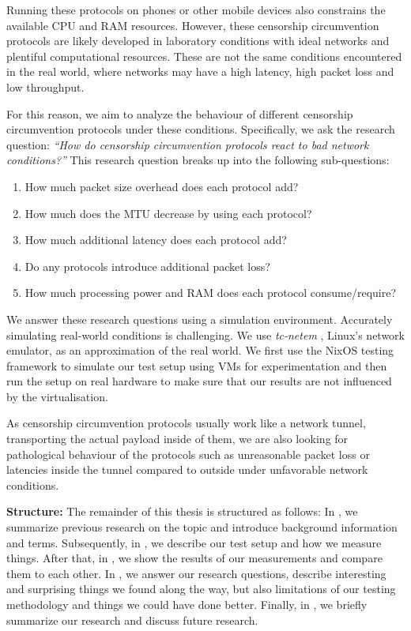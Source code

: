 Running these protocols on phones or other mobile devices also constrains the available CPU and RAM resources.
However, these censorship circumvention protocols are likely developed in laboratory conditions with ideal networks and plentiful computational resources.
These are not the same conditions encountered in the real world, where networks may have a high latency, high packet loss and low throughput.

For this reason, we aim to analyze the behaviour of different censorship circumvention protocols under these conditions.
Specifically, we ask the research question:
\emph{``How do censorship circumvention protocols react to bad network conditions?''}
This research question breaks up into the following sub-questions:
\begin{enumerate}
  \item How much packet size overhead does each protocol add?
  \item How much does the MTU decrease by using each protocol?
  \item How much additional latency does each protocol add?
  \item Do any protocols introduce additional packet loss?
  \item How much processing power and RAM does each protocol consume/require?
\end{enumerate}

We answer these research questions using a simulation environment.
Accurately simulating real-world conditions is challenging.
We use \textit{tc-netem} \cite{man8:tc-netem}, Linux's network emulator, as an approximation of the real world.
We first use the NixOS testing framework to simulate our test setup using VMs for experimentation and then run the setup on real hardware to make sure that our results are not influenced by the virtualisation.

As censorship circumvention protocols usually work like a network tunnel, transporting the actual payload inside of them, we are also looking for pathological behaviour of the protocols such as unreasonable packet loss or latencies inside the tunnel compared to outside under unfavorable network conditions.

\noindent\textbf{Structure:}
The remainder of this thesis is structured as follows:
In , we summarize previous research on the topic and introduce background information and terms.
Subsequently, in , we describe our test setup and how we measure things.
After that, in , we show the results of our measurements and compare them to each other.
In , we answer our research questions, describe interesting and surprising things we found along the way, but also limitations of our testing methodology and things we could have done better.
Finally, in , we briefly summarize our research and discuss future research.
